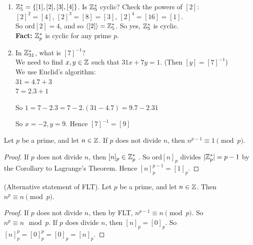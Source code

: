  
\begin{examples} \begin{enumerate}
 \item 	 {} 
 $\mathbb{Z}_5^* = \{[1],[2],[3],[4]\}$. Is $\mathbb{Z}_5^*$ cyclic? Check the powers of $[2]$:\\ $[2]^2 = [4]$, $[2]^3 = [8] = [3]$, $[2]^4 = [16] = [1]$.\\
  
  So ord$[2] = 4$, and so $\langle[2]\rangle = \mathbb{Z}_5^*$. So yes, $\mathbb{Z}_5^*$ is cyclic.\\
 
 \textbf{Fact:} $\mathbb{Z}_p^*$ is cyclic for any prime $p$.
 \item In $\mathbb{Z}_{31}^*$, what is $[7]^{-1}$?\\
 We need to find $x,y \in \mathbb{Z}$ such that $31x + 7y = 1$. (Then $[y] = [7]^{-1}$)\\ We use Euclid's algorithm:\\
 $31 = 4.7 + 3$\\
$ 7 = 2.3 + 1$
 
 So $1 = 7 - 2.3  = 7-2.(31-4.7) = 9.7 - 2.31$
 
 So $x = -2,y=9$. Hence $[7]^{-1} = [9]$
 \end{enumerate}
 \end{examples}\vspace*{10pt}

\begin{theorem}  Let $p$ be a prime, and let $n \in \mathbb{Z}$. If $p$ does not divide $n$, then $n^{p-1} \equiv 1 \pmod{p}$.	
\end{theorem}

\begin{proof}
If $p$ does not divide $n$, then $[n]_p \in \mathbb{Z}_p^*$	. So ord$[n]_p$ divides $|\mathbb{Z}_p^*| = p-1$ by the Corollary to Lagrange's Theorem. Hence $[n]_p^{p-1} = [1]_p$. 
\end{proof}\vspace*{10pt}

\begin{corollary} (Alternative statement of FLT). Let $p$ be a prime, and let $n \in \mathbb{Z}$. Then $n^p \equiv n \pmod{p}$.
	
\end{corollary}

\begin{proof}
If $p$ does not divide $n$, then by FLT, $n^{p-1} \equiv n \pmod{p}.$  So $n^p \equiv n \mod p.$ If $p$ does divide $n$, then $[n]_p = [0]_p$. So $[n]_p^p = [0]_p^p = [0]_p = [n]_p$.	
\end{proof}\vspace*{10pt}

